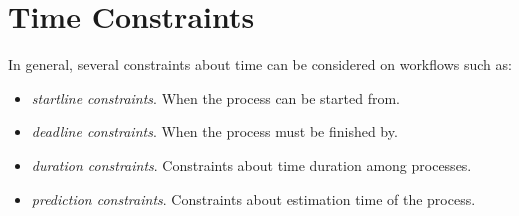 \section{Time Constraints}
\label{sec:timeConstraints}

In general, several constraints about time can be considered on
workflows such as:
\begin{itemize}
\setlength{\itemsep}{0mm}
\setlength{\parskip}{0mm}
 \item \emph{startline constraints}.  When the process can be started
     from.
 \item \emph{deadline constraints}.  When the process must be finished
     by.
 \item \emph{duration constraints}.  Constraints about time duration
     among processes.
 \item \emph{prediction constraints}.  Constraints about estimation time 
     of the process.
\end{itemize}

